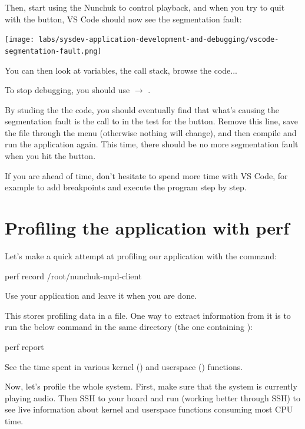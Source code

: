 Then, start using the Nunchuk to control playback, and when you try to
quit with the  button, VS Code should now see the segmentation
fault:

\texttt{[image: labs/sysdev-application-development-and-debugging/vscode-segmentation-fault.png]}

You can then look at variables, the call stack, browse the code...

To stop debugging, you should use  $\rightarrow$ .

By studing the the code, you should eventually find that what's causing
the segmentation fault is the call to  in the test for the
 button. Remove this line, save the file through the 
menu (otherwise nothing will change), and then compile and run the
application again. This time, there should be no more segmentation fault
when you hit the  button.

If you are ahead of time, don't hesitate to spend more time with VS
Code, for example to add breakpoints and execute the program step by
step.

\section{Profiling the application with perf}

Let's make a quick attempt at profiling our application with the
 command:

\begin{bashinput}
perf record /root/nunchuk-mpd-client
\end{bashinput}

Use your application and leave it when you are done.

This stores profiling data in a  file. One way to
extract information from it is to run the below command in the same
directory (the one containing ):

\begin{bashinput}
perf report
\end{bashinput}

See the time spent in various kernel (\code{[k]}) and userspace
(\code{[.]}) functions.

Now, let's profile the whole system. First, make sure that the system is
currently playing audio. Then SSH to your board and run 
(working better through SSH) to see live information about kernel and
userspace functions consuming most CPU time.

